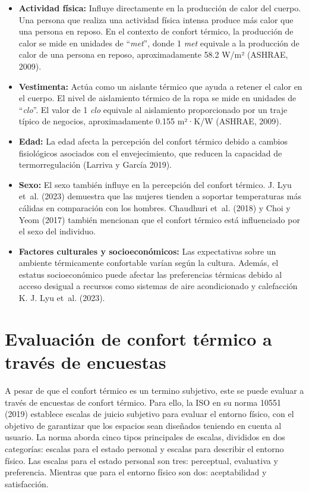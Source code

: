 \documentclass[
  12pt,
  letterpaper,
  DIV=11,
  numbers=noendperiod]{scrreport}
\begin{document}
\begin{itemize}
\item
  \textbf{Actividad física:} Influye directamente en la producción de
  calor del cuerpo. Una persona que realiza una actividad física intensa
  produce más calor que una persona en reposo. En el contexto de confort
  térmico, la producción de calor se mide en unidades de ``\emph{met}'',
  donde 1 \emph{met} equivale a la producción de calor de una persona en
  reposo, aproximadamente 58.2 W/m² (ASHRAE, 2009).
\item
  \textbf{Vestimenta:} Actúa como un aislante térmico que ayuda a
  retener el calor en el cuerpo. El nivel de aislamiento térmico de la
  ropa se mide en unidades de ``\emph{clo}''. El valor de 1 \emph{clo}
  equivale al aislamiento proporcionado por un traje típico de negocios,
  aproximadamente 0.155 m²·K/W (ASHRAE, 2009).
\item
  \textbf{Edad:} La edad afecta la percepción del confort térmico debido
  a cambios fisiológicos asociados con el envejecimiento, que reducen la
  capacidad de termorregulación (Larriva y García 2019).
\item
  \textbf{Sexo:} El sexo también influye en la percepción del confort
  térmico. J. Lyu et~al. (2023) demuestra que las mujeres tienden a
  soportar temperaturas más cálidas en comparación con los hombres.
  Chaudhuri et~al. (2018) y Choi y Yeom (2017) también mencionan que el
  confort térmico está influenciado por el sexo del individuo.
\item
  \textbf{Factores culturales y socioeconómicos:} Las expectativas sobre
  un ambiente térmicamente confortable varían según la cultura. Además,
  el estatus socioeconómico puede afectar las preferencias térmicas
  debido al acceso desigual a recursos como sistemas de aire
  acondicionado y calefacción K. J. Lyu et~al. (2023).
\end{itemize}

\hypertarget{evaluaciuxf3n-de-confort-tuxe9rmico-a-travuxe9s-de-encuestas}{%
\section{Evaluación de confort térmico a través de
encuestas}\label{evaluaciuxf3n-de-confort-tuxe9rmico-a-travuxe9s-de-encuestas}}

A pesar de que el confort térmico es un termino subjetivo, este se puede
evaluar a través de encuestas de confort térmico. Para ello, la ISO en
su norma 10551 (2019) establece escalas de juicio subjetivo para evaluar
el entorno físico, con el objetivo de garantizar que los espacios sean
diseñados teniendo en cuenta al usuario. La norma aborda cinco tipos
principales de escalas, divididos en dos categorías: escalas para el
estado personal y escalas para describir el entorno físico. Las escalas
para el estado personal son tres: perceptual, evaluativa y preferencia.
Mientras que para el entorno físico son dos: aceptabilidad y
satisfacción.
\end{document}
